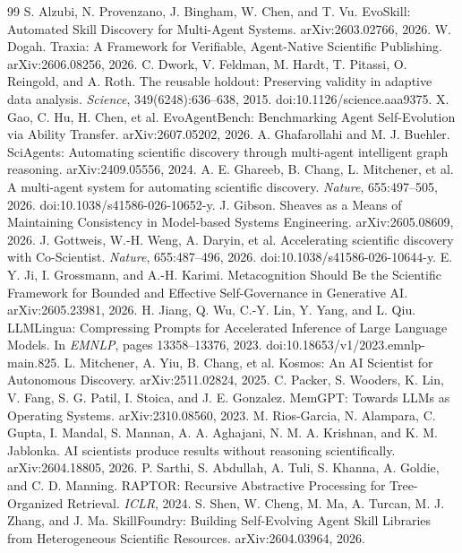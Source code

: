 \documentclass[11pt]{article}
\begin{document}
\begin{thebibliography}{99}
 S. Alzubi, N. Provenzano, J. Bingham, W. Chen, and T. Vu. EvoSkill: Automated Skill Discovery for Multi-Agent Systems. arXiv:2603.02766, 2026.
 W. Dogah. Traxia: A Framework for Verifiable, Agent-Native Scientific Publishing. arXiv:2606.08256, 2026.
 C. Dwork, V. Feldman, M. Hardt, T. Pitassi, O. Reingold, and A. Roth. The reusable holdout: Preserving validity in adaptive data analysis. \emph{Science}, 349(6248):636--638, 2015. doi:10.1126/science.aaa9375.
 X. Gao, C. Hu, H. Chen, et al. EvoAgentBench: Benchmarking Agent Self-Evolution via Ability Transfer. arXiv:2607.05202, 2026.
 A. Ghafarollahi and M. J. Buehler. SciAgents: Automating scientific discovery through multi-agent intelligent graph reasoning. arXiv:2409.05556, 2024.
 A. E. Ghareeb, B. Chang, L. Mitchener, et al. A multi-agent system for automating scientific discovery. \emph{Nature}, 655:497--505, 2026. doi:10.1038/s41586-026-10652-y.
 J. Gibson. Sheaves as a Means of Maintaining Consistency in Model-based Systems Engineering. arXiv:2605.08609, 2026.
 J. Gottweis, W.-H. Weng, A. Daryin, et al. Accelerating scientific discovery with Co-Scientist. \emph{Nature}, 655:487--496, 2026. doi:10.1038/s41586-026-10644-y.
 E. Y. Ji, I. Grossmann, and A.-H. Karimi. Metacognition Should Be the Scientific Framework for Bounded and Effective Self-Governance in Generative AI. arXiv:2605.23981, 2026.
 H. Jiang, Q. Wu, C.-Y. Lin, Y. Yang, and L. Qiu. LLMLingua: Compressing Prompts for Accelerated Inference of Large Language Models. In \emph{EMNLP}, pages 13358--13376, 2023. doi:10.18653/v1/2023.emnlp-main.825.
 L. Mitchener, A. Yiu, B. Chang, et al. Kosmos: An AI Scientist for Autonomous Discovery. arXiv:2511.02824, 2025.
 C. Packer, S. Wooders, K. Lin, V. Fang, S. G. Patil, I. Stoica, and J. E. Gonzalez. MemGPT: Towards LLMs as Operating Systems. arXiv:2310.08560, 2023.
 M. Rios-Garcia, N. Alampara, C. Gupta, I. Mandal, S. Mannan, A. A. Aghajani, N. M. A. Krishnan, and K. M. Jablonka. AI scientists produce results without reasoning scientifically. arXiv:2604.18805, 2026.
 P. Sarthi, S. Abdullah, A. Tuli, S. Khanna, A. Goldie, and C. D. Manning. RAPTOR: Recursive Abstractive Processing for Tree-Organized Retrieval. \emph{ICLR}, 2024.
 S. Shen, W. Cheng, M. Ma, A. Turcan, M. J. Zhang, and J. Ma. SkillFoundry: Building Self-Evolving Agent Skill Libraries from Heterogeneous Scientific Resources. arXiv:2604.03964, 2026.

\end{thebibliography}
\end{document}
